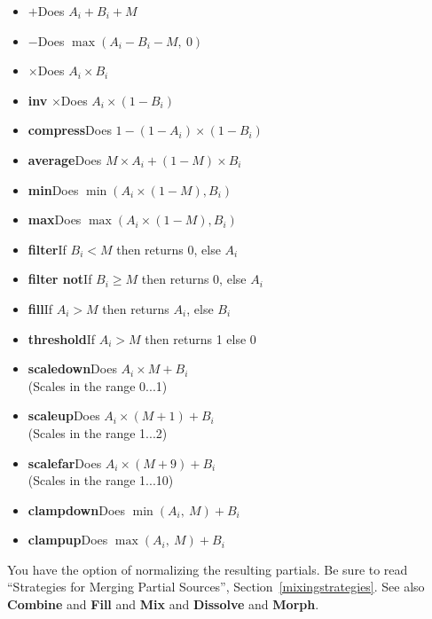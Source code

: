 \documentclass{article}
\begin{document}
{
\small
\begin{multicols}{2}
\begin{flushleft}
\begin{itemize}
\item \(\boldsymbol{+}\)\quad Does \(A_i + B_i + M\)
\item \(\boldsymbol -\)\quad Does \(\max(A_i - B_i - M,\ 0)\)
\item \(\boldsymbol \times\)\quad Does \(A_i \times B_i\)
\item {\bf inv} \(\boldsymbol \times\)\quad Does \(A_i \times (1 - B_i)\)
\item {\bf compress}\quad Does \(1 - (1 - A_i) \times (1 - B_i)\)
\item {\bf average}\quad Does \(M \times A_i + (1 - M) \times B_i\)
\item {\bf min}\quad Does \(\min(A_i \times (1 - M), B_i)\)
\item {\bf max}\quad Does \(\max(A_i \times (1 - M), B_i)\)
\item {\bf filter}\quad If \(B_i < M\) then returns 0, else \(A_i\)
\item {\bf filter not}\quad  If \(B_i \geq M\) then returns 0, else \(A_i\)
\item {\bf fill}\quad If \(A_i > M\) then returns \(A_i\), else \(B_i\)
\item {\bf threshold}\quad If \(A_i > M\) then returns 1 else 0
\item {\bf scaledown}\quad Does \(A_i \times M + B_i\)\\(Scales in the range 0...1)
\item {\bf scaleup}\quad Does \(A_i \times (M + 1) + B_i\)\\(Scales in the range 1...2)
\item {\bf scalefar}\quad Does \(A_i \times (M + 9) + B_i\)\\(Scales in the range 1...10)
\item {\bf clampdown}\quad Does \(\min(A_i,\ M) + B_i\)
\item {\bf clampup}\quad Does \(\max(A_i,\ M) + B_i\)
\end{itemize}
\end{flushleft}
\end{multicols}
}


You have the option of normalizing the resulting partials.   Be sure to read ``Strategies for Merging Partial Sources'', Section~\ref{mixingstrategies}.  See also {\bf Combine} and {\bf Fill} and {\bf Mix} and {\bf Dissolve}  and {\bf Morph}.
\end{document}
